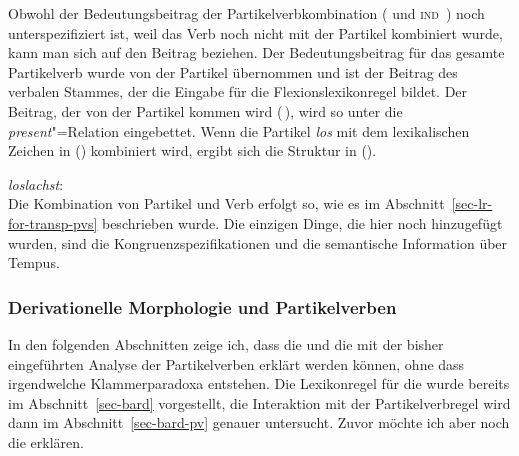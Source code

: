 \noindent
Obwohl der Bedeutungsbeitrag der Partikelverbkombination (\ltop {} und \textsc{ind} \,) noch unterspezifiziert
ist, weil das Verb noch nicht mit der Partikel kombiniert wurde, kann man sich
auf den Beitrag beziehen. Der Bedeutungsbeitrag für das gesamte Partikelverb wurde von der Partikel
übernommen und ist der Beitrag des verbalen Stammes, der die Eingabe für die Flexionslexikonregel
bildet. Der Beitrag, der von der Partikel kommen wird (\ltop {}\,), wird so unter
die \emph{present}"=Relation eingebettet. Wenn die Partikel \emph{los}
mit dem lexikalischen Zeichen in () kombiniert wird, ergibt sich die Struktur in ().

\eas
\emph{loslachst}:\\
\zs
Die Kombination von Partikel und Verb erfolgt so, wie es im Abschnitt~\ref{sec-lr-for-transp-pvs}
beschrieben wurde. Die einzigen Dinge, die hier noch hinzugefügt wurden, sind die
Kongruenzspezifikationen und die semantische Information über Tempus.



\subsubsection{Derivationelle Morphologie und Partikelverben}
\label{sec-derivation-hpsg}

In den folgenden Abschnitten zeige ich, dass die \geen und die \bard
mit der bisher eingeführten Analyse der Partikelverben erklärt werden können,
ohne dass irgendwelche Klammerparadoxa entstehen. Die Lexikonregel für die
\bard wurde bereits im Abschnitt~\ref{sec-bard} vorgestellt, die Interaktion mit der
Partikelverbregel wird dann im Abschnitt~\ref{sec-bard-pv} genauer untersucht.
Zuvor möchte ich aber noch die \geen erklären.


